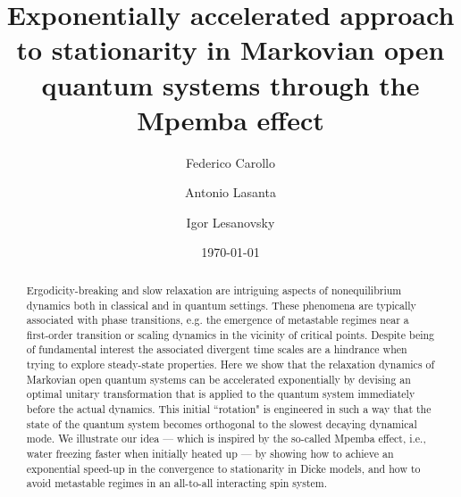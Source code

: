 \documentclass[prl,floatfix,twocolumn,superscriptaddress,showpacs,preprintnumbers,longbibliography,nofootinbib]{revtex4-1}
\begin{document}
\title{Exponentially accelerated approach to stationarity in
Markovian open quantum systems through the Mpemba effect}
       
\author{Federico Carollo}

\author{Antonio Lasanta}

\author{Igor Lesanovsky}



\begin{abstract}
Ergodicity-breaking and slow relaxation are intriguing aspects of nonequilibrium dynamics both in classical and in quantum settings. These phenomena are typically associated with phase transitions, e.g. the emergence of metastable regimes near a first-order transition or scaling dynamics in the vicinity of critical points. Despite being of fundamental interest the associated divergent time scales are a hindrance when trying to explore steady-state properties. Here we show that the relaxation dynamics of Markovian open quantum systems can be accelerated exponentially by devising an optimal unitary transformation that is applied to the quantum system immediately before the actual dynamics. This initial ``rotation" is engineered in such a way that the state of the quantum system becomes orthogonal to the slowest decaying dynamical mode. We illustrate our idea --- which is inspired by the so-called Mpemba effect, i.e., water freezing faster when initially heated up --- by showing how to achieve an exponential speed-up in the convergence to stationarity in Dicke models, and how to avoid metastable regimes in an all-to-all interacting spin system.  
\end{abstract}

\date{\today}
\maketitle
\end{document}
